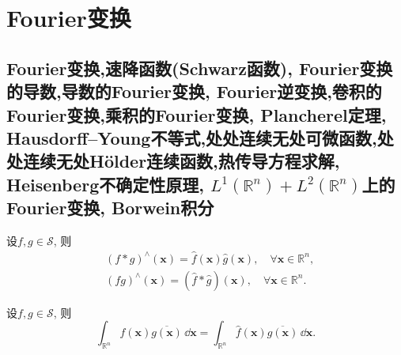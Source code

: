 \section{Fourier变换}
\subsection{Fourier变换,速降函数(Schwarz函数), Fourier变换的导数,导数的Fourier变换, Fourier逆变换,卷积的Fourier变换,乘积的Fourier变换, Plancherel定理, Hausdorff--Young不等式,处处连续无处可微函数,处处连续无处H\"{o}lder连续函数,热传导方程求解, Heisenberg不确定性原理, \(L^1(\mathbb{R}^n)+L^2(\mathbb{R}^n)\)上的Fourier变换, Borwein积分}
\begin{theorem}\label{Th:C12ff}
设\(f,g\in\mathscr{S}\), 则\[\begin{split}
&(f*g)^{\land}(\boldsymbol{x})=\widehat{f}(\boldsymbol{x})\widehat{g}(\boldsymbol{x}),\quad\forall\boldsymbol{x}\in\mathbb{R}^n,\\
&(fg)^{\land}(\boldsymbol{x})=(\widehat{f}*\widehat{g})(\boldsymbol{x}),\quad\forall\boldsymbol{x}\in\mathbb{R}^n.
\end{split}\]
\end{theorem}
\begin{theorem}\label{Th:C12fe}
设\(f,g\in\mathscr{S}\), 则\[\int_{\mathbb{R}^n}f(\boldsymbol{x})\overline{g(\boldsymbol{x})}\,\dd\boldsymbol{x}=\int_{\mathbb{R}^n}\widehat{f}(\boldsymbol{x})\overline{\widehat{g}(\boldsymbol{x})}\,\dd\boldsymbol{x}.\]
\end{theorem}
